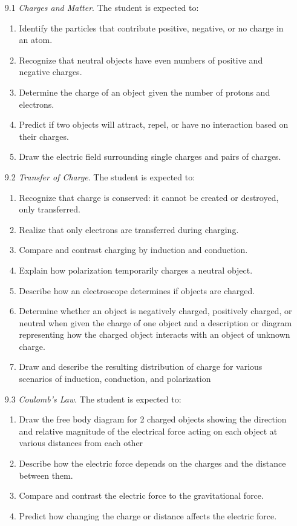 \documentclass[dvipsnames]{article}
\begin{document}
\begin{enumerate}
    \item[9.1] \textit{Charges and Matter}. The student is expected to:
    \begin{enumerate}
        \item Identify the particles that contribute positive, negative, or no charge in an atom.
        \item Recognize that neutral objects have even numbers of positive and negative charges.
        \item Determine the charge of an object given the number of protons and electrons.
        \item Predict if two objects will attract, repel, or have no interaction based on their charges.
        \item Draw the electric field surrounding single charges and pairs of charges.
    \end{enumerate}
    \item[9.2] \textit{Transfer of Charge}. The student is expected to:
    \begin{enumerate}
        \item Recognize that charge is conserved: it cannot be created or destroyed, only transferred.
        \item Realize that only electrons are transferred during charging.
        \item Compare and contrast charging by induction and conduction.
        \item Explain how polarization temporarily charges a neutral object.
        \item Describe how an electroscope determines if objects are charged.
        \item Determine whether an object is negatively charged, positively charged, or neutral when given the charge of one object and a description or diagram representing how the charged object interacts with an object of unknown charge.
        \item Draw and describe the resulting distribution of charge for various scenarios of induction, conduction, and polarization
    \end{enumerate}
    \item[9.3] \textit{Coulomb's Law}. The student is expected to:
    \begin{enumerate}
        \item Draw the free body diagram for 2 charged objects showing the direction and relative magnitude of the electrical force acting on each object at various distances from each other
        \item Describe how the electric force depends on the charges and the distance between them.
        \item Compare and contrast the electric force to the gravitational force.
        \item Predict how changing the charge or distance affects the electric force.
    \end{enumerate}
\end{enumerate}
\end{document}
